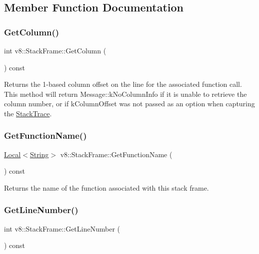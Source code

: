 \subsection{Member Function Documentation}
\mbox{\label{classv8_1_1StackFrame_a3b4d7d29ae82b88304d09ea5c5e43db1}} 
\subsubsection{\texorpdfstring{Get\+Column()}{GetColumn()}}
{\footnotesize\ttfamily int v8\+::\+Stack\+Frame\+::\+Get\+Column (\begin{DoxyParamCaption}{ }\end{DoxyParamCaption}) const}

Returns the 1-\/based column offset on the line for the associated function call. This method will return Message\+::k\+No\+Column\+Info if it is unable to retrieve the column number, or if k\+Column\+Offset was not passed as an option when capturing the \mbox{\hyperlink{classv8_1_1StackTrace}{Stack\+Trace}}. \mbox{\label{classv8_1_1StackFrame_a9cd783598db74ab35bd4ae7c8cbc374f}} 
\subsubsection{\texorpdfstring{Get\+Function\+Name()}{GetFunctionName()}}
{\footnotesize\ttfamily \mbox{\hyperlink{classv8_1_1Local}{Local}}$<$\mbox{\hyperlink{classv8_1_1String}{String}}$>$ v8\+::\+Stack\+Frame\+::\+Get\+Function\+Name (\begin{DoxyParamCaption}{ }\end{DoxyParamCaption}) const}

Returns the name of the function associated with this stack frame. \mbox{\label{classv8_1_1StackFrame_a34ab9f48a06525cd9f93e01a70427ca2}} 
\subsubsection{\texorpdfstring{Get\+Line\+Number()}{GetLineNumber()}}
{\footnotesize\ttfamily int v8\+::\+Stack\+Frame\+::\+Get\+Line\+Number (\begin{DoxyParamCaption}{ }\end{DoxyParamCaption}) const}

